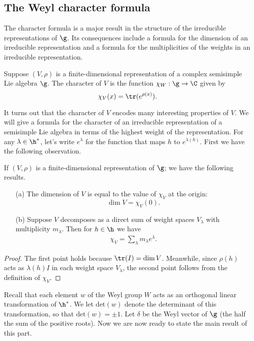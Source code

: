 \subsection{The Weyl character formula}
The character formula is a major result in the structure of the irreducible representations of $\g$. Its consequences include a formula for the dimension of an irreducible representation and a formula for the multiplicities of the weights in an irreducible representation.
\begin{definition}
Suppose $(V,\rho)$ is a finite-dimensional representation of a complex semisimple Lie algebra $\g$. The character of $V$ is the function $\chi_W:\g\to\C$ given by
\[\chi_V(x)=\tr(e^{\rho(x)}).\]
\end{definition}
It turns out that the character of $V$ encodes many interesting properties of $V$. We will give a formula for the character of an irreducible representation of a semisimple Lie algebra in terms of the highest weight of the representation. For any $\lambda\in\h^*$, let's write $e^\lambda$ for the function that maps $h$ to $e^{\lambda(h)}$. First we have the following observation.
\begin{proposition}\label{Lie algebra module character prop}
If $(V,\rho)$ is a finite-dimensional representation of $\g$; we have the following results.
\begin{itemize}
\item[(a)] The dimension of $V$ is equal to the value of $\chi_V$ at the origin:
\[\dim V=\chi_V(0).\] 
\item[(b)] Suppose $V$ decomposes as a direct sum of weight spaces $V_\lambda$ with multiplicity $m_\lambda$. Then for $h\in\h$ we have
\begin{align}\label{Lie algebra module character prop-1}
\chi_V=\sum_\lambda m_\lambda e^{\lambda}.
\end{align} 
\end{itemize}
\end{proposition}
\begin{proof}
The first point holds because $\tr(I)=\dim V$. Meanwhile, since $\rho(h)$ acts as $\lambda(h)I$ in each weight space $V_\lambda$, the second point follows from the definition of $\chi_V$.
\end{proof}
Recall that each element $w$ of the Weyl group $W$ acts as an orthogonal linear transformation of $\h^*$. We let $\mathrm{det}(w)$ denote the determinant of this transformation, so that $\mathrm{det}(w)=\pm 1$. Let $\delta$ be the Weyl vector of $\g$ (the half the sum of the positive roots). Now we are now ready to state the main result of this part.
